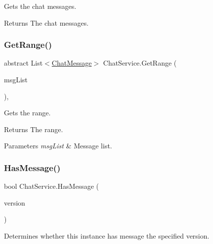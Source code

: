 Gets the chat messages. 

\begin{DoxyReturn}{Returns}
The chat messages.
\end{DoxyReturn}
\mbox{\label{class_chat_service_a0386ca23c48f3d389bbb600565585d37}} 
\subsubsection{\texorpdfstring{Get\+Range()}{GetRange()}}
{\footnotesize\ttfamily abstract List$<$\mbox{\hyperlink{class_t_net_1_1_model_1_1_chat_message}{Chat\+Message}}$>$ Chat\+Service.\+Get\+Range (\begin{DoxyParamCaption}\item[{List$<$ \mbox{\hyperlink{class_t_net_1_1_model_1_1_chat_message}{Chat\+Message}} $>$}]{msg\+List }\end{DoxyParamCaption})\hspace{0.3cm}{\ttfamily [protected]}, {}}



Gets the range. 

\begin{DoxyReturn}{Returns}
The range.
\end{DoxyReturn}

\begin{DoxyParams}{Parameters}
{\em msg\+List} & Message list.\\
\hline
\end{DoxyParams}
\mbox{\label{class_chat_service_a21e1bdf73ddabd0703168ad24546a260}} 
\subsubsection{\texorpdfstring{Has\+Message()}{HasMessage()}}
{\footnotesize\ttfamily bool Chat\+Service.\+Has\+Message (\begin{DoxyParamCaption}\item[{int}]{version }\end{DoxyParamCaption})}



Determines whether this instance has message the specified version. 

